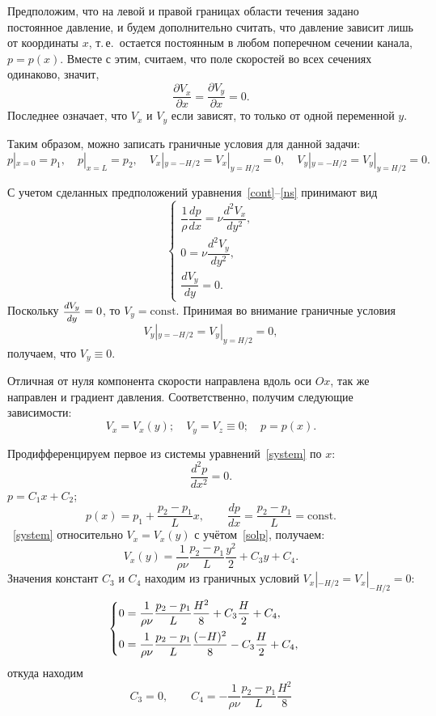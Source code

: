 \documentclass[12pt, a4paper]{article}
\begin{document}
Предположим, что на левой и правой границах области течения задано постоянное давление, и будем дополнительно считать, что давление зависит лишь от координаты $x$, т.\,е.\ остается постоянным в любом поперечном сечении канала, $p=p(x)$. Вместе с этим, считаем, что поле скоростей во всех сечениях одинаково, значит,
\[
\frac{\partial V_x}{\partial x}=\frac{\partial V_y}{\partial x}=0.
\]
Последнее означает, что $V_x$ и $V_y$ если зависят, то только от одной переменной $y$.


Таким образом, можно записать граничные условия для данной задачи:
\[
p|_{x=0} = p_1, \quad p|_{x=L} = p_2, \quad V_x|_{y=-H/2}=V_x|_{y=H/2}=0, \quad  V_y|_{y=-H/2}=V_y|_{y=H/2}=0.
\]

С учетом сделанных предположений уравнения~\eqref{cont}--\eqref{ns} принимают вид
\begin{equation}
\label{system}
\begin{cases}
\dfrac{1}{\rho}\dfrac{dp}{dx}=\nu \dfrac{d^2V_x}{dy^2},\\
0=\nu \dfrac{d^2 V_y}{dy^2},\\
\dfrac{dV_y}{dy}=0.
\end{cases}
\end{equation}
Поскольку $\hbox{\footnotesize$\displaystyle\frac{dV_y}{dy}$}=0$, то $V_y=\mathrm{const}$. Принимая во внимание граничные условия
\[
V_y|_{y=-H/2}=V_y|_{y=H/2}=0,
\]
получаем, что  $V_y \equiv 0$.

\pagebreak

Отличная от нуля компонента скорости направлена вдоль оси $Ox$, так же направлен и градиент давления. Соответственно, получим следующие зависимости:
\[
	V_x=V_x(y);\quad	V_y=V_z\equiv 0; \quad 	p=p(x).
\]


Продифференцируем первое из системы уравнений~\eqref{system} по $x$:
\[
	\frac{d^2p}{dx^2}=0.
\]
 $p=C_1x+C_2$; 
\begin{equation}
\label{solp}
	p(x) = p_1 + \frac{p_2-p_1}{L}x, \qquad \frac{dp}{dx}=\frac{p_2-p_1}{L} = \mathrm{const}.
\end{equation}
~\eqref{system} относительно $V_x=V_x(y)$ с учётом~\eqref{solp}, получаем:
\[
	V_x(y)=\frac{1}{\rho\nu}\frac{p_2-p_1}{L}\frac{y^2}{2}+C_3y+C_4.
\]
Значения констант $C_3$ и $C_4$ находим из граничных условий $V_x|_{-H/2} = V_x|_{-H/2} = 0$:
\[
	\begin{cases}
			0=\dfrac{1}{\rho\nu}\dfrac{p_2-p_1}{L}\dfrac{H^2}{8}+C_3\dfrac{H}{2}+C_4,\\[3mm]
			0=\dfrac{1}{\rho\nu}\dfrac{p_2-p_1}{L}\dfrac{(-H)^2}{8}-C_3\dfrac{H}{2}+C_4,
   \end{cases}\\
\]
откуда находим
\[
 C_3 = 0, \qquad C_4 =-\frac{1}{\rho\nu}\frac{p_2-p_1}{L}\frac{H^2}{8}
\]
\end{document}
